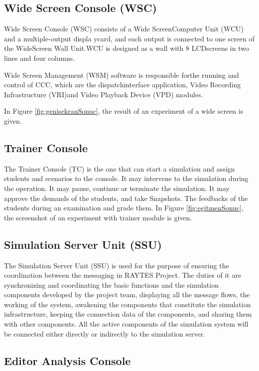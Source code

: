 \documentclass[conference]{IEEEtran}
\begin{document}
\subsection{Wide Screen Console (WSC)}

Wide   Screen   Console (WSC) consists of a Wide ScreenComputer Unit (WCU) and a multiple-output displa ycard, and each output is connected to one screen of the WideScreen  Wall  Unit.WCU is designed as a wall with 8 LCDscreens in two lines and four columns.


Wide Screen Management (WSM) software is responsible forthe  running  and  control of CCC,  which are the dispatchinterface application, Video Recording Infrastructure  (VRI)and Video Playback Device (VPD) modules.

In Figure \ref{fig:genisekranSonuc}, the result of an experiment of a wide screen is given.

\subsection{Trainer Console}

The Trainer Console (TC) is the one that can start a simulation and assign students and scenarios to the console. It may intervene to the simulation during the operation. It may
pause, continue or terminate the simulation. It may approve the demands of the students, and take Snapshots. The feedbacks of the students during an examination and grade them. In Figure \ref{fig:egitmenSonuc}, the screenshot of an experiment with trainer module is given.



\subsection{Simulation Server Unit (SSU)}

The Simulation Server Unit (SSU) is used for the purpose of ensuring the coordination between the messaging in RAYTES Project. The duties of it are synchronizing and coordinating the basic functions and the simulation components developed by the project team, displaying all the message flows, the working of the system, awakening the components that constitute the simulation infrastructure, keeping the connection data of the components, and sharing them with other components.
All the active components of the simulation system will be connected either directly or indirectly to the simulation server.
\subsection{Editor Analysis Console}
\end{document}

